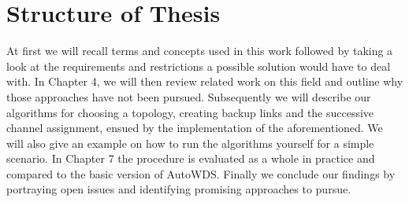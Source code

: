 \section{Structure of Thesis}
  At first we will recall terms and concepts used in this work followed by taking a look at the requirements and restrictions a possible solution would have to deal with.
  In Chapter 4, we will then review related work on this field and outline why those approaches have not been pursued.
  Subsequently we will describe our algorithms for choosing a topology, creating backup links and the successive channel assignment, ensued by the implementation of 
  the aforementioned. We will also give an example on how to run the algorithms yourself for a simple scenario.
  In Chapter 7 the procedure is evaluated as a whole in practice and compared to the basic version of AutoWDS.
  Finally we conclude our findings by portraying open issues and identifying promising approaches to pursue.
